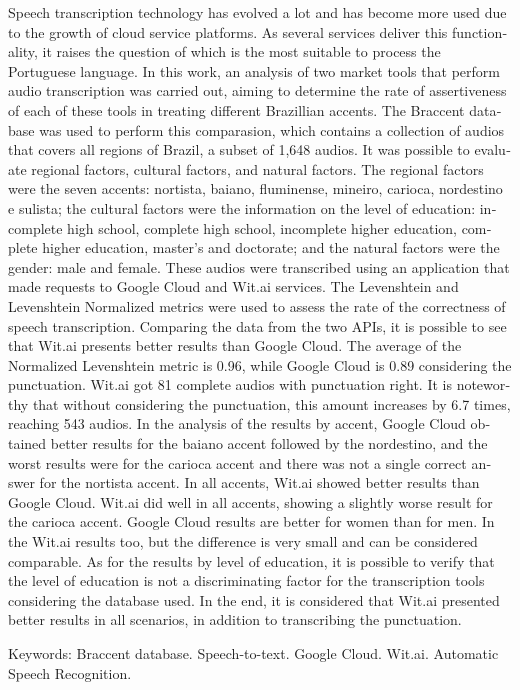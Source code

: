 
\begin{resumo}[ABSTRACT]
\begin{otherlanguage}{english}
\vspace*{-6mm}


Speech transcription technology has evolved a lot and has become more used due to the growth of cloud service platforms. As several services deliver this functionality, it raises the question of which is the most suitable to process the Portuguese language. In this work, an analysis of two market tools that perform audio transcription was carried out, aiming to determine the rate of assertiveness of each of these tools in treating different Brazillian accents. The Braccent database was used to perform this comparasion, which contains a collection of audios that covers all regions of Brazil, a subset of 1,648 audios. It was possible to evaluate regional factors, cultural factors, and natural factors. The regional factors were the seven accents: nortista, baiano, fluminense, mineiro, carioca, nordestino e sulista; the cultural factors were the information on the level of education: incomplete high school, complete high school, incomplete higher education, complete higher education, master's and doctorate; and the natural factors were the gender: male and female. These audios were transcribed using an application that made requests to Google Cloud and Wit.ai services. The Levenshtein and Levenshtein Normalized metrics were used to assess the rate of the correctness of speech transcription. Comparing the data from the two APIs, it is possible to see that Wit.ai presents better results than Google Cloud. The average of the Normalized Levenshtein metric is 0.96, while Google Cloud is 0.89 considering the punctuation. Wit.ai got 81 complete audios with punctuation right. It is noteworthy that without considering the punctuation, this amount increases by 6.7 times, reaching 543 audios. In the analysis of the results by accent, Google Cloud obtained better results for the baiano accent followed by the nordestino, and the worst results were for the carioca accent and there was not a single correct answer for the nortista accent. In all accents, Wit.ai showed better results than Google Cloud. Wit.ai did well in all accents, showing a slightly worse result for the carioca accent. Google Cloud results are better for women than for men. In the Wit.ai results too, but the difference is very small and can be considered comparable. As for the results by level of education, it is possible to verify that the level of education is not a discriminating factor for the transcription tools considering the database used. In the end, it is considered that Wit.ai presented better results in all scenarios, in addition to transcribing the punctuation. 



Keywords: Braccent database. Speech-to-text. Google Cloud. Wit.ai. Automatic Speech Recognition.


  \end{otherlanguage}
\end{resumo}
